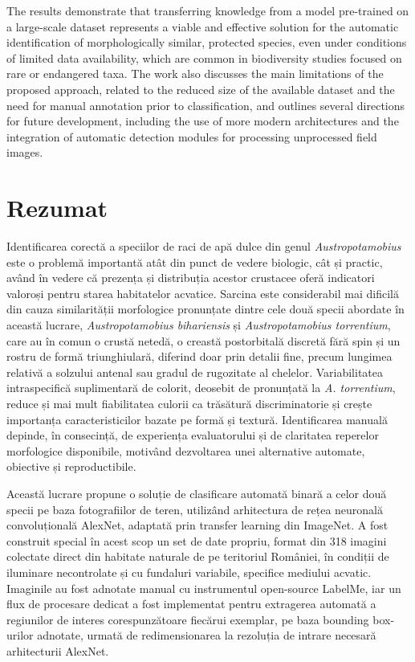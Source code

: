 \documentclass[12pt,a4paper]{report}
\theoremstyle{definition}
\theoremstyle{remark}
\begin{document}
The results demonstrate that transferring knowledge from a model pre-trained on a large-scale dataset represents a viable and effective solution for the automatic identification of morphologically similar, protected species, even under conditions of limited data availability, which are common in biodiversity studies focused on rare or endangered taxa. The work also discusses the main limitations of the proposed approach, related to the reduced size of the available dataset and the need for manual annotation prior to classification, and outlines several directions for future development, including the use of more modern architectures and the integration of automatic detection modules for processing unprocessed field images.

\newpage

\section*{Rezumat}

Identificarea corectă a speciilor de raci de apă dulce din genul \textit{Austropotamobius} este o problemă importantă atât din punct de vedere biologic, cât și practic, având în vedere că prezența și distribuția acestor crustacee oferă indicatori valoroși pentru starea habitatelor acvatice. Sarcina este considerabil mai dificilă din cauza similarității morfologice pronunțate dintre cele două specii abordate în această lucrare, \textit{Austropotamobius bihariensis} și \textit{Austropotamobius torrentium}, care au în comun o crustă netedă, o creastă postorbitală discretă fără spin și un rostru de formă triunghiulară, diferind doar prin detalii fine, precum lungimea relativă a solzului antenal sau gradul de rugozitate al chelelor. Variabilitatea intraspecifică suplimentară de colorit, deosebit de pronunțată la \textit{A. torrentium}, reduce și mai mult fiabilitatea culorii ca trăsătură discriminatorie și crește importanța caracteristicilor bazate pe formă și textură. Identificarea manuală depinde, în consecință, de experiența evaluatorului și de claritatea reperelor morfologice disponibile, motivând dezvoltarea unei alternative automate, obiective și reproductibile.

Această lucrare propune o soluție de clasificare automată binară a celor două specii pe baza fotografiilor de teren, utilizând arhitectura de rețea neuronală convoluțională AlexNet, adaptată prin transfer learning din ImageNet. A fost construit special în acest scop un set de date propriu, format din 318 imagini colectate direct din habitate naturale de pe teritoriul României, în condiții de iluminare necontrolate și cu fundaluri variabile, specifice mediului acvatic. Imaginile au fost adnotate manual cu instrumentul open-source LabelMe, iar un flux de procesare dedicat a fost implementat pentru extragerea automată a regiunilor de interes corespunzătoare fiecărui exemplar, pe baza bounding box-urilor adnotate, urmată de redimensionarea la rezoluția de intrare necesară arhitecturii AlexNet.
\end{document}
